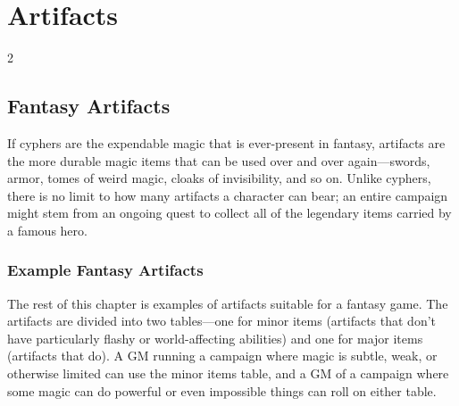 \part{Artifacts}

\begin{multicols}{2}

\chapter{Fantasy Artifacts}

If cyphers are the expendable magic that is ever-present in fantasy, artifacts are the more durable magic items that can be used over and over again—swords, armor, tomes of weird magic, cloaks of invisibility, and so on. Unlike cyphers, there is no limit to how many artifacts a character can bear; an entire campaign might stem from an ongoing quest to collect all of the legendary items carried by a famous hero.

\section{Example Fantasy Artifacts}

The rest of this chapter is examples of artifacts suitable for a fantasy game. The artifacts are divided into two tables—one for minor items (artifacts that don’t have particularly flashy or world-affecting abilities) and one for major items (artifacts that do). A GM running a campaign where magic is subtle, weak, or otherwise limited can use the minor items table, and a GM of a campaign where some magic can do powerful or even impossible things can roll on either table.

\end{multicols}

